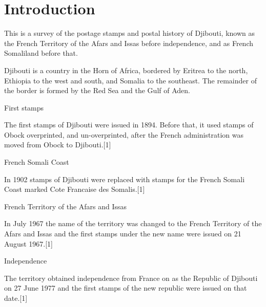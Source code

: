 
\chapter{Introduction}
This is a survey of the postage stamps and postal history of Djibouti, known as the French Territory of the Afars and Issas before independence, and as French Somaliland before that.

Djibouti is a country in the Horn of Africa, bordered by Eritrea to the north, Ethiopia to the west and south, and Somalia to the southeast. The remainder of the border is formed by the Red Sea and the Gulf of Aden.

 
First stamps

The first stamps of Djibouti were issued in 1894. Before that, it used stamps of Obock overprinted, and un-overprinted, after the French administration was moved from Obock to Djibouti.[1]


French Somali Coast

In 1902 stamps of Djibouti were replaced with stamps for the French Somali Coast marked Cote Francaise des Somalis.[1]

French Territory of the Afars and Issas

In July 1967 the name of the territory was changed to the French Territory of the Afars and Issas and the first stamps under the new name were issued on 21 August 1967.[1]

Independence

The territory obtained independence from France on as the Republic of Djibouti on 27 June 1977 and the first stamps of the new republic were issued on that date.[1]     